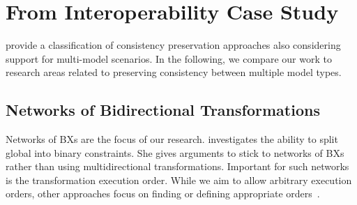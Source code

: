 \section{From Interoperability Case Study}

\textcite{macedo2017a} provide a classification of consistency preservation approaches also considering support for multi-model scenarios. %
In the following, we compare our work to research areas related to preserving consistency between multiple model types.

\subsection*{Networks of Bidirectional Transformations} 
Networks of \acp{BX} are the focus of our research.
\textcite{stevens2017a} investigates the ability to split global into binary constraints.
She gives arguments to stick to networks of \acp{BX} rather than using multidirectional transformations. %
Important for such networks is the transformation execution order. 
While we aim to allow arbitrary execution orders, other approaches focus on finding or defining appropriate orders~\cite{stevens2018megamodels}.


